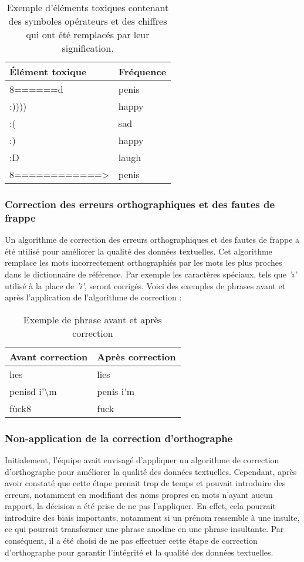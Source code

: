 \begin{table}[h]
\centering
\begin{tabular}{|l|l|}
\hline
\textbf{Élément toxique} & \textbf{Fréquence} \\ \hline
8======d~~ & penis \\ \hline
:)))) & happy \\ \hline
:( & sad \\ \hline
:) & happy \\ \hline
:D & laugh \\ \hline
8============> & penis \\ \hline
\end{tabular}
\caption{Exemple d'éléments toxiques contenant des symboles opérateurs et des chiffres qui ont été remplacés par leur signification.}
\end{table}



\subsubsection*{Correction des erreurs orthographiques et des fautes de frappe}

Un algorithme de correction des erreurs orthographiques et des fautes de frappe a été utilisé pour améliorer la qualité des données textuelles. Cet algorithme remplace les mots incorrectement orthographiés par les mots les plus proches dans le dictionnaire de référence. Par exemple les caractères spéciaux, tels que \textit{'ı'} utilisé à la place de \textit{'i'}, seront corrigés. Voici des exemples de phrases avant et après l'application de l'algorithme de correction :

\begin{table}[h]
    \centering
    \begin{tabular}{|l|l|}
    \hline
    \textbf{Avant correction} & \textbf{Après correction} \\ \hline
    lıes  & lies \\ \hline
    penisd i'\textbackslash m & penis i'm  \\ \hline
    fùck8 & fuck  \\ \hline
    \end{tabular}
    \caption{Exemple de phrase avant et après correction}
\end{table}

\subsubsection*{Non-application de la correction d'orthographe}
Initialement, l'équipe avait envisagé d'appliquer un algorithme de correction d'orthographe pour améliorer la qualité des données textuelles. Cependant, après avoir constaté que cette étape prenait trop de temps et pouvait introduire des erreurs, notamment en modifiant des noms propres en mots n'ayant aucun rapport, la décision a été prise de ne pas l'appliquer. En effet, cela pourrait introduire des biais importants, notamment si un prénom ressemble à une insulte, ce qui pourrait transformer une phrase anodine en une phrase insultante. Par conséquent, il a été choisi de ne pas effectuer cette étape de correction d'orthographe pour garantir l'intégrité et la qualité des données textuelles.

